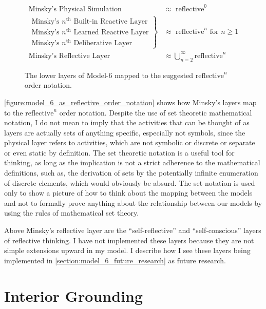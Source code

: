 \begin{figure}[bth]
\begin{align*}
\text{Minsky's Physical Simulation}~ &{\approx} \text{ reflective}^0 \\
\left.
  \begin{array}{l}
    \text{Minsky's $n^{\text{th}}$ Built-in Reactive Layer} \\
    \text{Minsky's $n^{\text{th}}$ Learned Reactive Layer} \\
    \text{Minsky's $n^{\text{th}}$ Deliberative Layer}
  \end{array}
\right\}                             &{\approx} \text{ reflective}^n \text{ for $n \geq 1$}\\
\text{Minsky's Reflective Layer}~    &{\approx} \bigcup_{n=2}^{\infty}{\text{reflective}^n}
\end{align*}
\caption{The lower layers of Model-6 mapped to the suggested
  $\text{reflective}^n$ order notation.}
\label{figure:model_6_as_reflective_order_notation}
\end{figure}

\autoref{figure:model_6_as_reflective_order_notation} shows how
Minsky's layers map to the $\text{reflective}^n$ order notation.
Despite the use of set theoretic mathematical notation, I do not mean
to imply that the activities that can be thought of as layers are
actually sets of anything specific, especially not symbols, since the
physical layer refers to activities, which are not symbolic or
discrete or separate or even static by definition.  The set theoretic
notation is a useful tool for thinking, as long as the implication is
not a strict adherence to the mathematical definitions, such as, the
derivation of sets by the potentially infinite enumeration of discrete
elements, which would obviously be absurd.  The set notation is used
only to show a picture of how to think about the mapping between the
models and not to formally prove anything about the relationship
between our models by using the rules of mathematical set theory.

Above Minsky's reflective layer are the ``self-reflective'' and
``self-conscious'' layers of reflective thinking.  I have not
implemented these layers because they are not simple extensions upward
in my model.  I describe how I see these layers being implemented in
\autoref{section:model_6_future_research} as future research.

\section{Interior Grounding}

